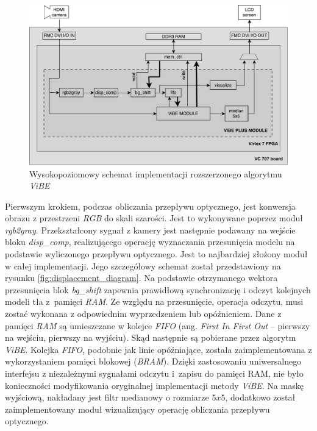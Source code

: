 	\begin{figure}[h!]
		\centering
		\includegraphics[scale=0.6]{img/4/vibe_plus.pdf}
		\caption{Wysokopoziomowy schemat implementacji rozszerzonego algorytmu \textit{ViBE}}
		\label{fig:vibe_plus_diagram}
	\end{figure}

Pierwszym krokiem, podczas obliczania przepływu optycznego, jest konwersja obrazu z przestrzeni \textit{RGB} do skali szarości. Jest to wykonywane poprzez moduł \textit{rgb2gray}. Przekształcony sygnał z kamery jest następnie podawany na wejście bloku \textit{disp\_comp}, realizującego operację wyznaczania przesunięcia modelu na podstawie wyliczonego przepływu optycznego. Jest to najbardziej złożony moduł w całej implementacji. Jego szczegółowy schemat został przedstawiony na rysunku \ref{fig:displacement_diagram}. Na podstawie otrzymanego wektora przesunięcia blok \textit{bg\_shift} zapewnia prawidłową synchronizację i odczyt kolejnych modeli tła z~pamięci \textit{RAM}. Ze względu na przesunięcie, operacja odczytu, musi zostać wykonana z odpowiednim wyprzedzeniem lub opóźnieniem. Dane z pamięci \textit{RAM} są umieszczane w kolejce \textit{FIFO} (ang. \textit{First In First Out} -- pierwszy na wejściu, pierwszy na wyjściu). Skąd następnie są pobierane przez algorytm \textit{ViBE}. Kolejka \textit{FIFO}, podobnie jak linie opóźniające, została zaimplementowana z wykorzystaniem pamięci blokowej (\textit{BRAM}). Dzięki zastosowaniu uniwersalnego interfejsu z niezależnymi sygnałami odczytu i~zapisu do pamięci RAM, nie było konieczności modyfikowania oryginalnej implementacji metody \textit{ViBE}. Na maskę wyjściową, nakładany jest filtr medianowy o rozmiarze $5x5$, dodatkowo został zaimplementowany moduł wizualizujący operację obliczania przepływu optycznego.

